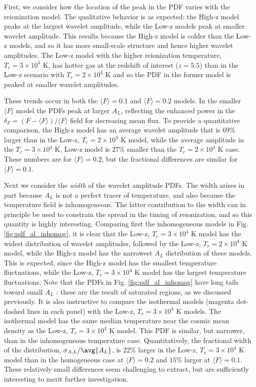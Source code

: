 First, we consider how the location of the peak in the PDF varies with the reionization model. The qualitative behavior is as expected: the High-z model
peaks at the largest wavelet amplitude, while the Low-z models peak at smaller wavelet amplitude. This results because the High-z model is colder than
the Low-z models, and so it has more small-scale structure and hence higher wavelet amplitudes. The Low-z model with the higher reionization 
temperature, $T_r = 3 \times 10^4$ K, has hotter gas at the redshift of interest ($z=5.5$) than in the Low-z scenario with $T_r = 2 \times 10^4$ K
and so the PDF in the former model is peaked at smaller wavelet amplitudes. 

These trends occur in both the $\langle F \rangle=0.1$ and $\langle F \rangle=0.2$ models. In
the smaller $\langle F \rangle$ model the PDFs peak at larger $A_L$, reflecting the enhanced power in the $\delta_F = (F - \langle F \rangle)/\langle F \rangle$ field for decreasing
mean flux. To provide a quantitative comparison, the High-z model has an average wavelet amplitude that is $69\%$ larger than in the Low-z, 
$T_r = 2 \times 10^4$ K model, while the average amplitude in the $T_r = 3 \times 10^4$ K, Low-z model is $27\%$ smaller than the $T_r =2 \times 10^4$ K 
case. These numbers are for $\langle F \rangle=0.2$, but the fractional differences are similar for $\langle F \rangle=0.1$.

Next we consider the {\em width} of the wavelet amplitude PDFs. The width arises in part because $A_L$ is not a perfect
tracer of temperature, and also because the temperature field is inhomogeneous. The latter contribution to the width 
can in principle be used to constrain the spread in the timing of reionization, and so this quantity is highly interesting. Comparing first
the inhomogeneous models in Fig. \ref{fig:pdf_al_inhomog}, it is clear that the Low-z, $T_r=3 \times 10^4$ K model has
the widest distribution of wavelet amplitudes, followed by the Low-z, $T_r=2 \times 10^4$ K model, while the High-z model
has the narrowest $A_L$ distribution of these models. This is expected, since the High-z model has the smallest temperature
fluctuations, while the Low-z, $T_r = 3 \times 10^4$ K model has the largest temperature fluctuations. Note that
the PDFs in Fig. \ref{fig:pdf_al_inhomog} have long tails toward small $A_L$ : these are the result of saturated regions,
as we discussed previously.
It is also instructive
to compare the isothermal models (magenta dot-dashed lines in each panel) with the Low-z, $T_r=3 \times 10^4$ K models. The isothermal model has the same median temperature near the cosmic mean density as the Low-z, $T_r=3 \times 10^4$ K model. This PDF is similar, but narrower, than in the inhomogeneous temperature case. Quantitatively, the fractional width of the distribution, $\sigma_{A,L}/\avg{A_L}$, is $22\%$ larger in the Low-z, $T_r=3 \times 10^4$ K model than in the homogeneous case at $\langle F \rangle=0.2$ and
$15\%$ larger at $\langle F \rangle=0.1$. These relatively small differences seem challenging to extract, but are sufficiently interesting to merit further
investigation.



